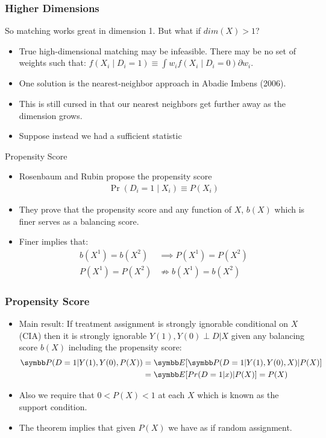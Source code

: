 \documentclass[aspectratio=169,11pt]{beamer}
\begin{document}
\begin{frame}
\frametitle{Higher Dimensions}
So matching works great in dimension 1. But what if $dim(X) > 1$?
\begin{itemize}
\item True high-dimensional matching may be infeasible. There may be no set of weights such that:
$f(X_i \mid D_i=1) \equiv \int w_i f(X_i \mid D_i=0) \partial w_i $.
\item One solution is the nearest-neighbor approach in Abadie Imbens (2006).
\item This is still cursed in that our nearest neighbors get further away as the dimension grows.
\item Suppose instead we had a \alert{sufficient statistic}
\end{itemize}
\end{frame}

\begin{frame}{Propensity Score}
\begin{itemize}
\item Rosenbaum and Rubin propose the \alert{propensity score}
\begin{align*}
\Pr(D_i  = 1 \mid X_i) \equiv P(X_i)
\end{align*}
\item They prove that the propensity score and any function of $X$, $b(X)$ which is finer serves as a \alert{balancing score}.
\item Finer implies that:
\begin{align*}
b(X^1) = b(X^2) &\implies P(X^1) = P(X^2)\\
P(X^1) = P(X^2) & \nRightarrow  b(X^1) = b(X^2)
\end{align*}
\end{itemize}
\end{frame}


\begin{frame}
\frametitle{Propensity Score}
\begin{itemize}
\item Main result: If treatment assignment is strongly ignorable conditional on $X$ (CIA) then it is strongly ignorable $Y(1),Y(0) \perp D | X$ given any balancing score $b(X)$ including the propensity score:
\begin{align*}
\Pr(D=1 | Y(1), Y(0),P(X))&= \E[\Pr(D=1| Y(1),Y(0),X) | P(X)] \\
&= \E[Pr(D=1 | x) | P(X) ] = P(X)
\end{align*}
\item Also we require that $0 < P(X) < 1$ at each $X$ which is known as the \alert{support condition}.
\item The theorem implies that given $P(X)$ we have as if random assignment.
\end{itemize}
\end{frame}
\end{document}

